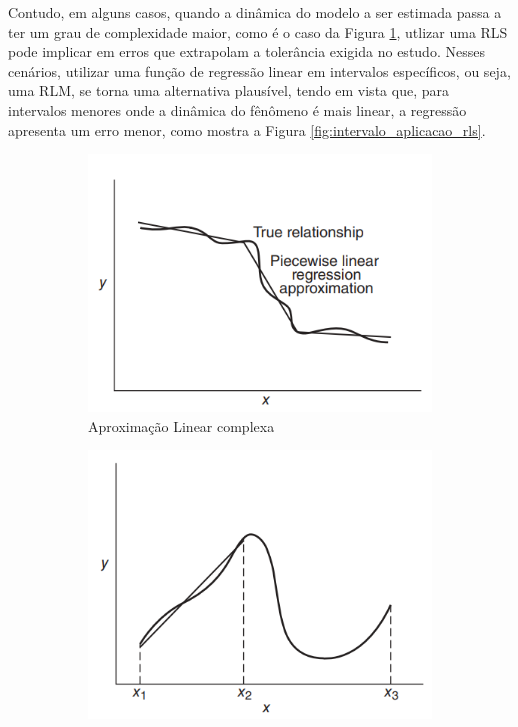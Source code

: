 Contudo, em alguns casos, quando a dinâmica do modelo a ser estimada passa a ter um grau de complexidade maior, como é o caso da Figura \ref{fig:aproximacao_linear_complexa}, utlizar uma RLS pode implicar em erros que extrapolam a tolerância exigida no estudo. Nesses cenários, utilizar uma função de regressão linear em intervalos específicos, ou seja, uma RLM, se torna uma alternativa plausível, tendo em vista que, para intervalos menores onde a dinâmica do fênômeno é mais linear, a regressão apresenta um erro menor, como mostra a Figura \ref{fig:intervalo_aplicacao_rls}.

\begin{figure}[H]
	\centering
	\caption{Situações de inadequação da RLS}
	\begin{subfigure}{0.4\textwidth}
	  \includegraphics[width=\linewidth]{figuras/piecewise_linear_approximation.png}
	  \caption{Aproximação Linear complexa}
	  \label{fig:aproximacao_linear_complexa}
	\end{subfigure}
	\hspace{0.5cm}
	\begin{subfigure}{0.4\textwidth} 
		\includegraphics[width=\linewidth]{figuras/danger_extrapolation_regression.png}

\end{subfigure}
\end{figure}
